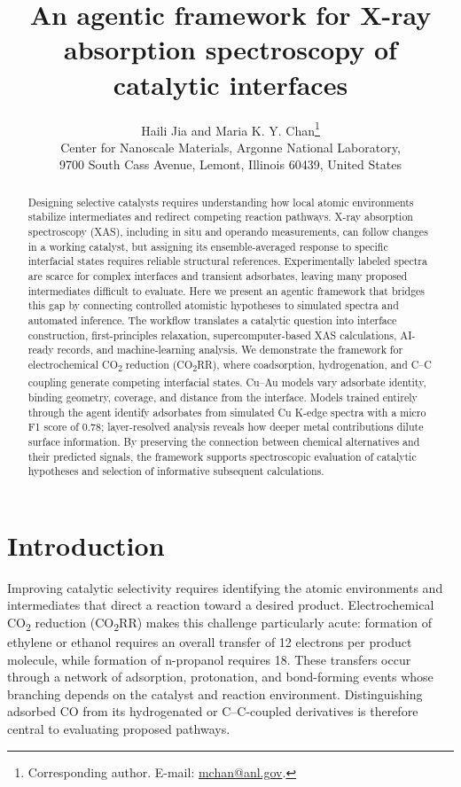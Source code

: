 \documentclass[11pt,a4paper]{article}
\title{An agentic framework for X-ray absorption spectroscopy of catalytic interfaces}
\author{Haili Jia and Maria K. Y. Chan\thanks{Corresponding author. E-mail: \href{mailto:mchan@anl.gov}{mchan@anl.gov}.}\\[0.6em]
\small Center for Nanoscale Materials, Argonne National Laboratory,\\
\small 9700 South Cass Avenue, Lemont, Illinois 60439, United States}
\date{}
\begin{document}
\maketitle
\begin{abstract}
Designing selective catalysts requires understanding how local atomic environments stabilize intermediates and redirect competing reaction pathways. X-ray absorption spectroscopy (XAS), including in situ and operando measurements, can follow changes in a working catalyst, but assigning its ensemble-averaged response to specific interfacial states requires reliable structural references. Experimentally labeled spectra are scarce for complex interfaces and transient adsorbates, leaving many proposed intermediates difficult to evaluate. Here we present an agentic framework that bridges this gap by connecting controlled atomistic hypotheses to simulated spectra and automated inference. The workflow translates a catalytic question into interface construction, first-principles relaxation, supercomputer-based XAS calculations, AI-ready records, and machine-learning analysis. We demonstrate the framework for electrochemical CO\textsubscript{2} reduction (CO\textsubscript{2}RR), where coadsorption, hydrogenation, and C--C coupling generate competing interfacial states. Cu--Au models vary adsorbate identity, binding geometry, coverage, and distance from the interface. Models trained entirely through the agent identify adsorbates from simulated Cu K-edge spectra with a micro F1 score of 0.78; layer-resolved analysis reveals how deeper metal contributions dilute surface information. By preserving the connection between chemical alternatives and their predicted signals, the framework supports spectroscopic evaluation of catalytic hypotheses and selection of informative subsequent calculations.
\end{abstract}

\section{Introduction}
Improving catalytic selectivity requires identifying the atomic environments and intermediates that direct a reaction toward a desired product. Electrochemical CO\textsubscript{2} reduction (CO\textsubscript{2}RR) makes this challenge particularly acute: formation of ethylene or ethanol requires an overall transfer of 12 electrons per product molecule, while formation of n-propanol requires 18.\cite{ni2024,francis2018} These transfers occur through a network of adsorption, protonation, and bond-forming events whose branching depends on the catalyst and reaction environment. Distinguishing adsorbed CO from its hydrogenated or C--C-coupled derivatives is therefore central to evaluating proposed pathways.\cite{zhan2024,montoya2015}
\end{document}
